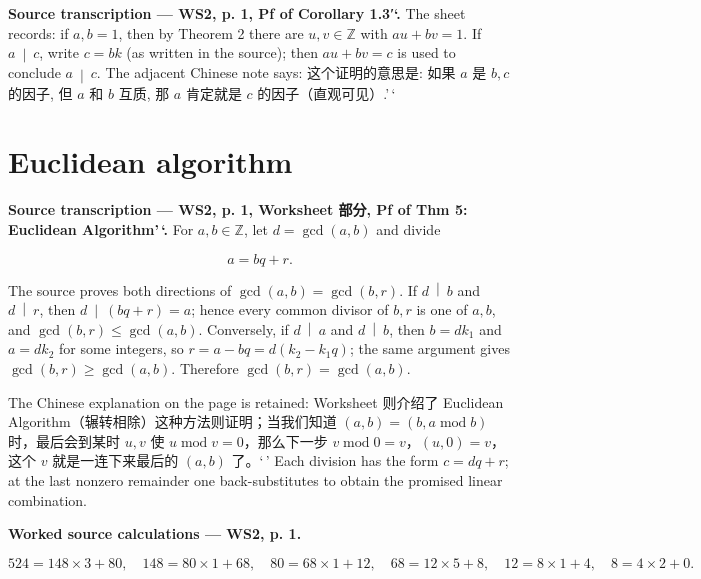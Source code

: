 \textbf{Source transcription --- WS2, p. 1, Pf of Corollary 1.3′`.} The sheet records: if \(a,b = 1\), then by Theorem 2 there are \(u,v \in \mathbb{Z}\) with \(au + bv = 1\). If \(\left. a\  \middle| \ c \right.\), write \(c = bk\) (as written in the source); then \(au + bv = c\) is used to conclude \(\left. a\  \middle| \ c \right.\). The adjacent Chinese note says: 这个证明的意思是: 如果 \(a\) 是 \(b,c\) 的因子, 但 \(a\) 和 \(b\) 互质, 那 \(a\) 肯定就是 \(c\) 的因子（直观可见）.'\,`

\section{Euclidean algorithm}

\textbf{Source transcription --- WS2, p. 1, Worksheet 部分, Pf of Thm 5: Euclidean Algorithm'\,`.} For \(a,b \in \mathbb{Z}\), let \(d = \gcd\left( {a,b} \right)\) and divide

\[a = bq + r.\]

The source proves both directions of \(\gcd\left( {a,b} \right) = \gcd\left( {b,r} \right)\). If \(\left. d\  \middle| \ b \right.\) and \(\left. d\  \middle| \ r \right.\), then \(\left. d\  \middle| \ \left( {bq + r} \right) = a \right.\); hence every common divisor of \(b,r\) is one of \(a,b\), and \(\gcd\left( {b,r} \right) \leq \gcd\left( {a,b} \right)\). Conversely, if \(\left. d\  \middle| \ a \right.\) and \(\left. d\  \middle| \ b \right.\), then \(b = dk_{1}\) and \(a = dk_{2}\) for some integers, so \(r = a - bq = d\left( {k_{2} - k_{1}q} \right)\); the same argument gives \(\gcd\left( {b,r} \right) \geq \gcd\left( {a,b} \right)\). Therefore \(\gcd\left( {b,r} \right) = \gcd\left( {a,b} \right)\).

The Chinese explanation on the page is retained: Worksheet 则介绍了 Euclidean Algorithm（辗转相除）这种方法则证明；当我们知道 \(\left( {a,b} \right) = \left( {b,a\operatorname{mod}b} \right)\) 时，最后会到某时 \(u,v\) 使 \(u\operatorname{mod}v = 0\)，那么下一步 \(v\operatorname{mod}0 = v\)，\(\left( {u,0} \right) = v\)，这个 \(v\) 就是一连下来最后的 \(\left( {a,b} \right)\) 了。`\,' Each division has the form \(c = dq + r\); at the last nonzero remainder one back-substitutes to obtain the promised linear combination.

\textbf{Worked source calculations --- WS2, p. 1.}

\[524 = 148 \times 3 + 80,\quad 148 = 80 \times 1 + 68,\quad 80 = 68 \times 1 + 12,\quad 68 = 12 \times 5 + 8,\quad 12 = 8 \times 1 + 4,\quad 8 = 4 \times 2 + 0.\]

